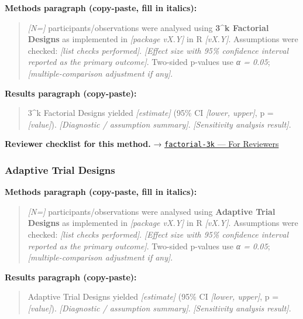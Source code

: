 \documentclass[
]{article}
\begin{document}
\textbf{Methods paragraph (copy-paste, fill in italics):}

\begin{quote}
\emph{{[}N={]}} participants/observations were analysed using
\textbf{3\^{}k Factorial Designs} as implemented in \emph{{[}package
vX.Y{]}} in R \emph{{[}vX.Y{]}}. Assumptions were checked: \emph{{[}list
checks performed{]}}. \emph{{[}Effect size with 95\% confidence interval
reported as the primary outcome{]}}. Two-sided p-values use \emph{α =
0.05}; \emph{{[}multiple-comparison adjustment if any{]}}.
\end{quote}

\textbf{Results paragraph (copy-paste):}

\begin{quote}
3\^{}k Factorial Designs yielded \emph{{[}estimate{]}} (95\% CI
\emph{{[}lower, upper{]}}, p = \emph{{[}value{]}}). \emph{{[}Diagnostic
/ assumption summary{]}}. \emph{{[}Sensitivity analysis result{]}}.
\end{quote}

\textbf{Reviewer checklist for this method.} →
\href{../chapters/16-design/factorial-3k.Rmd\#for-reviewers}{\texttt{factorial-3k}
--- For Reviewers}

\subsubsection{Adaptive Trial Designs}\label{adaptive-trial-designs}

\textbf{Methods paragraph (copy-paste, fill in italics):}

\begin{quote}
\emph{{[}N={]}} participants/observations were analysed using
\textbf{Adaptive Trial Designs} as implemented in \emph{{[}package
vX.Y{]}} in R \emph{{[}vX.Y{]}}. Assumptions were checked: \emph{{[}list
checks performed{]}}. \emph{{[}Effect size with 95\% confidence interval
reported as the primary outcome{]}}. Two-sided p-values use \emph{α =
0.05}; \emph{{[}multiple-comparison adjustment if any{]}}.
\end{quote}

\textbf{Results paragraph (copy-paste):}

\begin{quote}
Adaptive Trial Designs yielded \emph{{[}estimate{]}} (95\% CI
\emph{{[}lower, upper{]}}, p = \emph{{[}value{]}}). \emph{{[}Diagnostic
/ assumption summary{]}}. \emph{{[}Sensitivity analysis result{]}}.
\end{quote}
\end{document}
